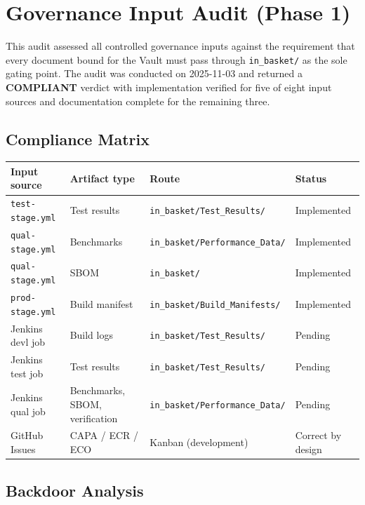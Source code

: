 
\section{Governance Input Audit (Phase 1)}

This audit assessed all controlled governance inputs against the requirement that every
document bound for the Vault must pass through \texttt{in\_basket/} as the sole gating
point. The audit was conducted on 2025-11-03 and returned a \textbf{COMPLIANT} verdict
with implementation verified for five of eight input sources and documentation complete
for the remaining three.

\subsection{Compliance Matrix}

\begin{center}
\begin{tabular}{llll}
\toprule
Input source & Artifact type & Route & Status \\
\midrule
\texttt{test-stage.yml} & Test results & \texttt{in\_basket/Test\_Results/} & Implemented \\
\texttt{qual-stage.yml} & Benchmarks & \texttt{in\_basket/Performance\_Data/} & Implemented \\
\texttt{qual-stage.yml} & SBOM & \texttt{in\_basket/} & Implemented \\
\texttt{prod-stage.yml} & Build manifest & \texttt{in\_basket/Build\_Manifests/} & Implemented \\
Jenkins devl job & Build logs & \texttt{in\_basket/Test\_Results/} & Pending \\
Jenkins test job & Test results & \texttt{in\_basket/Test\_Results/} & Pending \\
Jenkins qual job & Benchmarks, SBOM, verification & \texttt{in\_basket/Performance\_Data/} & Pending \\
GitHub Issues & CAPA / ECR / ECO & Kanban (development) & Correct by design \\
\bottomrule
\end{tabular}
\end{center}

\subsection{Backdoor Analysis}


